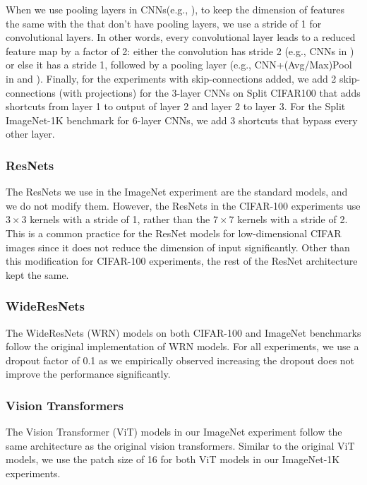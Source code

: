 When we use pooling layers in CNNs(e.g., ), to keep the dimension of features the same with the  that don't have pooling layers, we use a stride of 1 for convolutional layers. In other words, every convolutional layer leads to a reduced feature map by a factor of 2: either the convolution has stride 2 (e.g., CNNs in ) or else it has a stride 1, followed by a pooling layer (e.g., CNN+(Avg/Max)Pool in  and ). Finally, for the experiments with skip-connections added, we add 2 skip-connections (with projections) for the 3-layer CNNs on Split CIFAR100 that adds shortcuts from layer 1 to output of layer 2 and layer 2 to layer 3. For the Split ImageNet-1K benchmark for 6-layer CNNs, we add 3 shortcuts that bypass every other layer.

\subsubsection{ResNets}
The ResNets we use in the ImageNet experiment are the standard models, and we do not modify them. However, the ResNets in the CIFAR-100 experiments use $3 \times 3$ kernels with a stride of 1, rather than the $7 \times 7$ kernels with a stride of 2. This is a common practice for the ResNet models for low-dimensional CIFAR images since it does not reduce the dimension of input significantly. Other than this modification for CIFAR-100 experiments, the rest of the ResNet architecture kept the same.

\subsubsection{WideResNets}
The WideResNets (WRN) models on both CIFAR-100 and ImageNet benchmarks follow the original implementation of WRN models. For all experiments, we use a dropout factor of 0.1 as we empirically observed increasing the dropout does not improve the performance significantly. 

\subsubsection{Vision Transformers}
The Vision Transformer (ViT) models in our ImageNet experiment follow the same architecture as the original vision transformers. Similar to the original ViT models, we use the patch size of 16 for both ViT models in our ImageNet-1K experiments.

